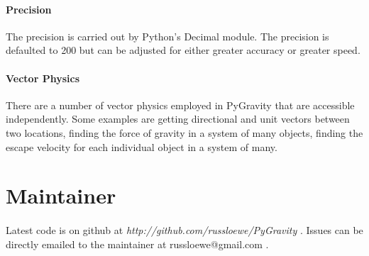 \documentclass[15pt]{report}
\begin{document}
\paragraph{Precision}The precision is carried out by Python's Decimal module. The precision is defaulted to 200 but can be 
adjusted for either greater accuracy or greater speed.

\paragraph{Vector Physics} There are a number of vector physics employed in PyGravity that are accessible independently. Some 
examples are getting directional and unit vectors between two locations, finding the force of gravity in a system of many objects, 
finding the escape velocity for each individual object in a system of many.

\section{Maintainer}
\paragraph{} Latest code is on github at \textit{http://github.com/russloewe/PyGravity} . Issues can be directly emailed to the 
maintainer at russloewe@gmail.com . 
\end{document}
